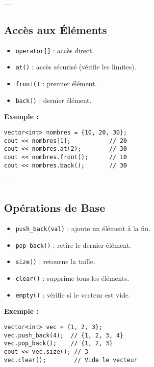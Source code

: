 ---

\subsection{ Accès aux Éléments}
\begin{itemize}
    \item \texttt{operator[]} : accès direct.
    \item \texttt{at()} : accès sécurisé (vérifie les limites).
    \item \texttt{front()} : premier élément.
    \item \texttt{back()} : dernier élément.
\end{itemize}

\textbf{Exemple :}
\begin{tcolorbox}[colframe=blue!50!black, colback=blue!5!white, title=Exemple d'Accès aux Éléments]
\begin{verbatim}
vector<int> nombres = {10, 20, 30};
cout << nombres[1];           // 20
cout << nombres.at(2);        // 30
cout << nombres.front();      // 10
cout << nombres.back();       // 30
\end{verbatim}
\end{tcolorbox}

---

\subsection{ Opérations de Base}
\begin{itemize}
    \item \texttt{push\_back(val)} : ajoute un élément à la fin.
    \item \texttt{pop\_back()} : retire le dernier élément.
    \item \texttt{size()} : retourne la taille.
    \item \texttt{clear()} : supprime tous les éléments.
    \item \texttt{empty()} : vérifie si le vecteur est vide.
\end{itemize}

\textbf{Exemple :}
\begin{tcolorbox}[colframe=blue!50!black, colback=blue!5!white, title=Exemple d'Opérations de Base]
\begin{verbatim}
vector<int> vec = {1, 2, 3};
vec.push_back(4);  // {1, 2, 3, 4}
vec.pop_back();    // {1, 2, 3}
cout << vec.size(); // 3
vec.clear();        // Vide le vecteur
\end{verbatim}
\end{tcolorbox}

